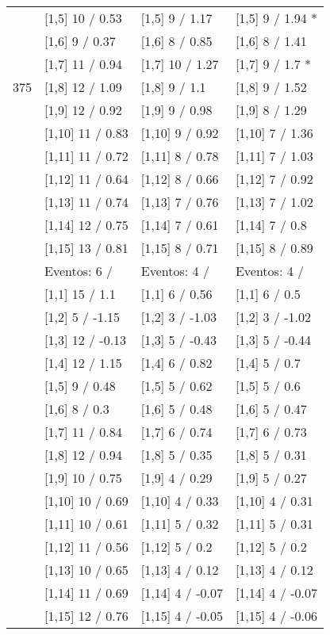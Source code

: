 \begin{table}
\begin{tabular}[t]{llll}
 & {}[1,5] 10  / 0.53 & {}[1,5] 9  / 1.17 & {}[1,5] 9  / 1.94 *\\
 & {}[1,6] 9  / 0.37 & {}[1,6] 8  / 0.85 & {}[1,6] 8  / 1.41\\
 & {}[1,7] 11  / 0.94 & {}[1,7] 10  / 1.27 & {}[1,7] 9  / 1.7 *\\
375 & {}[1,8] 12  / 1.09 & {}[1,8] 9  / 1.1 & {}[1,8] 9  / 1.52\\
\addlinespace
 & {}[1,9] 12  / 0.92 & {}[1,9] 9  / 0.98 & {}[1,9] 8  / 1.29\\
 & {}[1,10] 11  / 0.83 & {}[1,10] 9  / 0.92 & {}[1,10] 7  / 1.36\\
 & {}[1,11] 11  / 0.72 & {}[1,11] 8  / 0.78 & {}[1,11] 7  / 1.03\\
 & {}[1,12] 11  / 0.64 & {}[1,12] 8  / 0.66 & {}[1,12] 7  / 0.92\\
 & {}[1,13] 11  / 0.74 & {}[1,13] 7  / 0.76 & {}[1,13] 7  / 1.02\\
\addlinespace
 & {}[1,14] 12  / 0.75 & {}[1,14] 7  / 0.61 & {}[1,14] 7  / 0.8\\
 & {}[1,15] 13  / 0.81 & {}[1,15] 8  / 0.71 & {}[1,15] 8  / 0.89\\
 & Eventos:  6 / & Eventos:  4 / & Eventos:  4 /\\
 & {}[1,1] 15  / 1.1 & {}[1,1] 6  / 0.56 & {}[1,1] 6  / 0.5\\
 & {}[1,2] 5  / -1.15 & {}[1,2] 3  / -1.03 & {}[1,2] 3  / -1.02\\
\addlinespace
 & {}[1,3] 12  / -0.13 & {}[1,3] 5  / -0.43 & {}[1,3] 5  / -0.44\\
 & {}[1,4] 12  / 1.15 & {}[1,4] 6  / 0.82 & {}[1,4] 5  / 0.7\\
 & {}[1,5] 9  / 0.48 & {}[1,5] 5  / 0.62 & {}[1,5] 5  / 0.6\\
 & {}[1,6] 8  / 0.3 & {}[1,6] 5  / 0.48 & {}[1,6] 5  / 0.47\\
 & {}[1,7] 11  / 0.84 & {}[1,7] 6  / 0.74 & {}[1,7] 6  / 0.73\\
\addlinespace
500 & {}[1,8] 12  / 0.94 & {}[1,8] 5  / 0.35 & {}[1,8] 5  / 0.31\\
 & {}[1,9] 10  / 0.75 & {}[1,9] 4  / 0.29 & {}[1,9] 5  / 0.27\\
 & {}[1,10] 10  / 0.69 & {}[1,10] 4  / 0.33 & {}[1,10] 4  / 0.31\\
 & {}[1,11] 10  / 0.61 & {}[1,11] 5  / 0.32 & {}[1,11] 5  / 0.31\\
 & {}[1,12] 11  / 0.56 & {}[1,12] 5  / 0.2 & {}[1,12] 5  / 0.2\\
\addlinespace
 & {}[1,13] 10  / 0.65 & {}[1,13] 4  / 0.12 & {}[1,13] 4  / 0.12\\
 & {}[1,14] 11  / 0.69 & {}[1,14] 4  / -0.07 & {}[1,14] 4  / -0.07\\
 & {}[1,15] 12  / 0.76 & {}[1,15] 4  / -0.05 & {}[1,15] 4  / -0.06\\
\bottomrule
\end{tabular}
\end{table}
